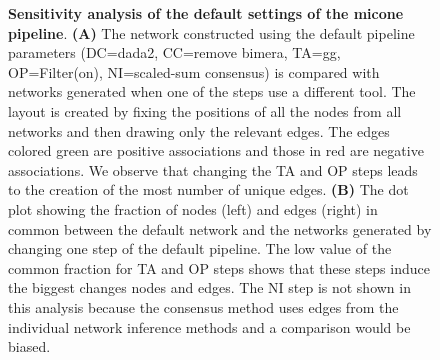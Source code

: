   \begin{figure}[H]
    \centering
    \caption{
      \textbf{Sensitivity analysis of the default settings of the \ac{micone} pipeline}.
      \textbf{(A)} The network constructed using the default pipeline parameters (DC=\ac{dada2}, CC=remove bimera, TA=\ac{gg}, OP=Filter(on), NI=scaled-sum consensus) is compared with networks generated when one of the steps use a different tool.
      The layout is created by fixing the positions of all the nodes from all networks and then drawing only the relevant edges.
      The edges colored green are positive associations and those in red are negative associations.
      We observe that changing the TA and OP steps leads to the creation of the most number of unique edges.
      \textbf{(B)} The dot plot showing the fraction of nodes (left) and edges (right) in common between the default network and the networks generated by changing one step of the default pipeline.
      The low value of the common fraction for TA and OP steps shows that these steps induce the biggest changes nodes and edges.
      The NI step is not shown in this analysis because the consensus method uses edges from the individual network inference methods and a comparison would be biased.
    }
    \label{fig:figure_s7}
  \end{figure}

